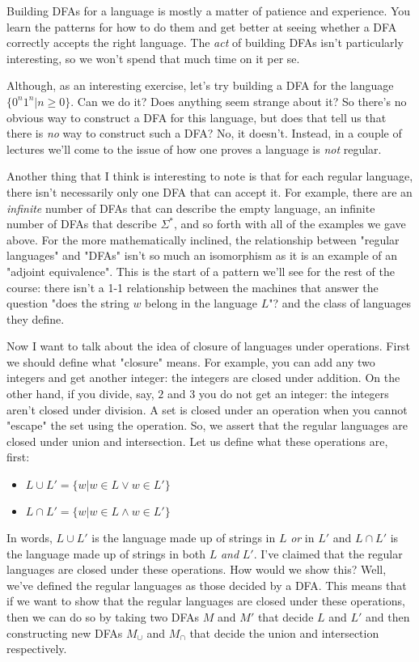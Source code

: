 \documentclass[11pt]{article}
\begin{document}
Building DFAs for a language is mostly a matter of patience and experience. You learn the patterns for how to do them and get better at seeing whether a DFA correctly accepts the right language. The \emph{act} of building DFAs isn't particularly interesting, so we won't spend that much time on it per se.

Although, as an interesting exercise, let's try building a DFA for the language $\{0^n1^n | n \geq 0\}$. Can we do it? Does anything seem strange about it? So there's no obvious way to construct a DFA for this language, but does that tell us that there is \emph{no} way to construct such a DFA? No, it doesn't. Instead, in a couple of lectures we'll come to the issue of how one proves a language is \emph{not} regular.

Another thing that I think is interesting to note is that for each regular language, there isn't necessarily only one DFA that can accept it. For example, there are an \emph{infinite} number of DFAs that can describe the empty language, an infinite number of DFAs that describe $\Sigma^*$, and so forth with all of the examples we gave above. For the more mathematically inclined, the relationship between "regular languages" and "DFAs" isn't so much an isomorphism as it is an example of an "adjoint equivalence". This is the start of a pattern we'll see for the rest of the course: there isn't a 1-1 relationship between the machines that answer the question "does the string $w$ belong in the language $L$"? and the class of languages they define.

Now I want to talk about the idea of closure of languages under operations. First we should define what "closure" means. For example, you can add any two integers and get another integer: the integers are closed under addition. On the other hand, if you divide, say, $2$ and $3$ you do not get an integer: the integers aren't closed under division. A set is closed under an operation when you cannot "escape" the set using the operation. So, we assert that the regular languages are closed under union and intersection. Let us define what these operations are, first:

\begin{itemize}
\item $L \cup L' = \{ w | w \in L \vee w \in L'\}$
\item $L \cap L' = \{ w | w \in L \wedge w \in L'\}$
\end{itemize}

In words, $L \cup L'$ is the language made up of strings in $L$ \emph{or} in $L'$ and $L \cap L'$ is the language made up of strings in both $L$ \emph{and} $L'$. I've claimed that the regular languages are closed under these operations. How would we show this? Well, we've defined the regular languages as those decided by a DFA. This means that if we want to show that the regular languages are closed under these operations, then we can do so by taking two DFAs $M$ and $M'$ that decide $L$ and $L'$ and then constructing new DFAs $M_{\cup}$ and $M_{\cap}$ that decide the union and intersection respectively.
\end{document}
